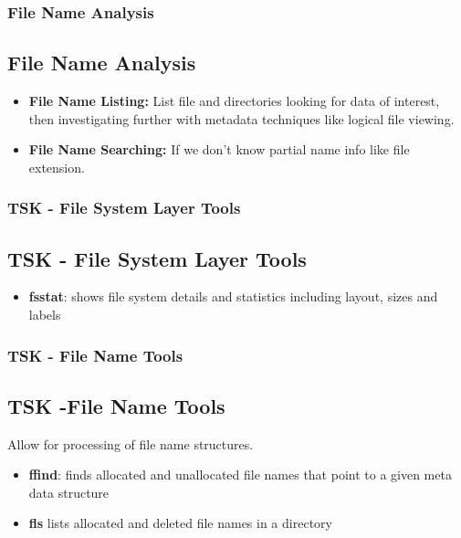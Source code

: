 \documentclass{beamer}
\begin{document}
\begin{frame}
\frametitle{File Name Analysis}
	\subsection*{File Name Analysis}
	\begin{itemize}
		\item \textbf{File Name Listing:} List file and directories looking for data of interest, then investigating further with metadata techniques like logical file viewing.
		\item \textbf{File Name Searching:} If we don't know partial name info like file extension.
    \end{itemize}
\end{frame}

\begin{frame}[allowframebreaks]
	\frametitle{TSK - File System Layer Tools}
	\subsection*{TSK - File System Layer Tools}
	\begin{itemize}
		\item \textbf{fsstat}: shows file system details and statistics including layout, sizes and labels
	\end{itemize}	
\end{frame}

\begin{frame}
	\frametitle{TSK - File Name Tools}
	\subsection*{TSK -File Name Tools}
	Allow for processing of file name structures.
	\begin{itemize}
		\item \textbf{ffind}: finds allocated and unallocated file names that point to a given meta data structure
		\item \textbf{fls} lists allocated and deleted file names in a directory
	\end{itemize}		
\end{frame}
\end{document}
